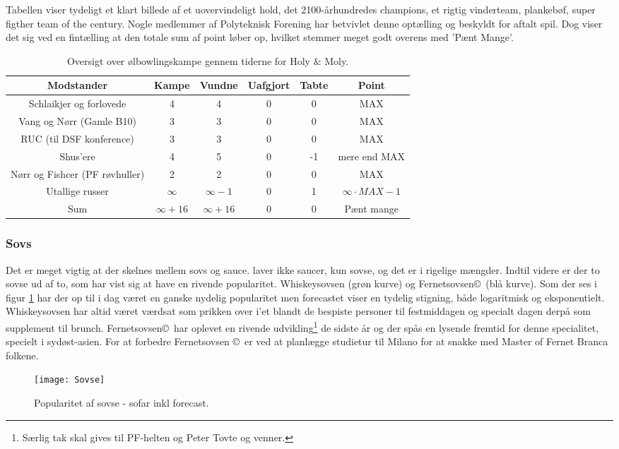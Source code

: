 Tabellen viser tydeligt et klart billede af et uovervindeligt hold, det 2100-århundredes champions, et rigtig vinderteam, plankebøf, super figther team of the century\cite{bib:url:2xThyboe}. Nogle medlemmer af Polyteknisk Forening har betvivlet denne optælling og beskyldt \HM for aftalt spil. Dog viser det sig ved en fintælling at den totale sum af point løber op, hvilket stemmer meget godt overens med 'Pænt Mange'.
\begin{table}[h!]
\centering
\begin{tabular}{|c|c|c|c|c|c|} \hline 
Modstander & Kampe & Vundne & Uafgjort & Tabte & Point \\ \hline \hline
Schlaikjer og forlovede & 4 & 4 & 0 & 0 & MAX \\ \hline
Vang og Nørr (Gamle B10) & 3 & 3 & 0 & 0 & MAX \\ \hline
RUC (til DSF konference) & 3 & 3 & 0 & 0 & MAX \\ \hline
Shus'ere & 4 & 5 & 0 & -1 & mere end MAX \\ \hline
Nørr og Fishcer (PF røvhuller) & 2 & 2 & 0 & 0 & MAX \\ \hline
Utallige russer & $\infty $ & $\infty - 1 $ & 0 & 1 & $\infty \cdot MAX -1$ \\ \hline \hline
Sum & $\infty + 16 $ & $\infty + 16$ & 0 & 0 & Pænt mange \\ \hline
\end{tabular}
\caption{Oversigt over ølbowlingskampe gennem tiderne for Holy \& Moly\texttrademark.}
\label{tab:BeerBow}
\end{table}

\subsubsection{Sovs}
Det er meget vigtig at der skelnes mellem sovs og sauce. \HM laver ikke saucer, kun sovse, og det er i rigelige mængder. Indtil videre er der to sovse ud af to, som har vist sig at have en rivende popularitet. Whiskeysovsen (grøn kurve) og Fernetsovsen\textregistered \copyright \texttrademark \, (blå kurve). Som der ses i figur \ref{fig:Sovse} har der op til i dag været en ganske nydelig popularitet men forecastet viser en tydelig stigning, både logaritmisk og eksponentielt. Whiskeysovsen har altid været værdsat som prikken over i'et blandt de bespiste personer til festmiddagen og specialt dagen derpå som supplement til brunch. Fernetsovsen\textregistered \copyright \texttrademark \, har oplevet en rivende udvikling\footnote{Særlig tak skal gives til PF-helten og Peter Tovte og venner.} de sidste år og der spås en lysende fremtid for denne specialitet, specielt i sydøst-asien. For at forbedre Fernetsovsen \textregistered \copyright \texttrademark \, er \HM ved at planlægge studietur til Milano for at snakke med Master of Fernet Branca folkene. 
\begin{figure}[h!]
\centering
\texttt{[image: Sovse]}
\caption{Popularitet af sovse - sofar inkl forecast.}
\label{fig:Sovse}
\end{figure}

